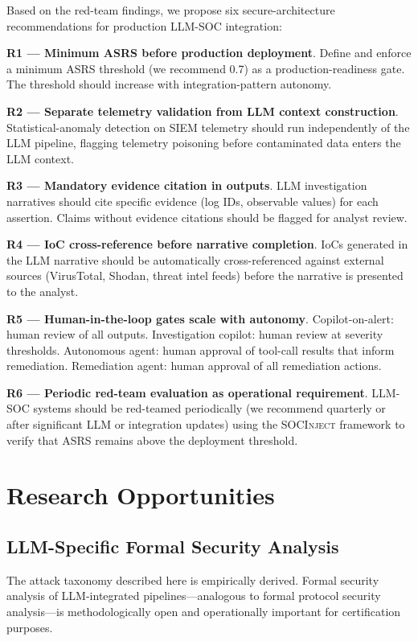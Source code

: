 \documentclass[sigconf,nonacm]{acmart}
\begin{document}
Based on the red-team findings, we propose six secure-architecture
recommendations for production LLM-SOC integration:

\textbf{R1 --- Minimum ASRS before production deployment}. Define
and enforce a minimum ASRS threshold (we recommend 0.7) as a
production-readiness gate. The threshold should increase with
integration-pattern autonomy.

\textbf{R2 --- Separate telemetry validation from LLM context
construction}. Statistical-anomaly detection on SIEM telemetry
should run independently of the LLM pipeline, flagging telemetry
poisoning before contaminated data enters the LLM context.

\textbf{R3 --- Mandatory evidence citation in outputs}. LLM
investigation narratives should cite specific evidence (log IDs,
observable values) for each assertion. Claims without evidence
citations should be flagged for analyst review.

\textbf{R4 --- IoC cross-reference before narrative completion}.
IoCs generated in the LLM narrative should be automatically
cross-referenced against external sources (VirusTotal, Shodan,
threat intel feeds) before the narrative is presented to the
analyst.

\textbf{R5 --- Human-in-the-loop gates scale with autonomy}.
Copilot-on-alert: human review of all outputs. Investigation
copilot: human review at severity thresholds. Autonomous agent:
human approval of tool-call results that inform remediation.
Remediation agent: human approval of all remediation actions.

\textbf{R6 --- Periodic red-team evaluation as operational
requirement}. LLM-SOC systems should be red-teamed periodically
(we recommend quarterly or after significant LLM or integration
updates) using the \textsc{SOCInject} framework to verify that
ASRS remains above the deployment threshold.

\section{Research Opportunities}

\subsection{LLM-Specific Formal Security Analysis}

The attack taxonomy described here is empirically derived.
Formal security analysis of LLM-integrated pipelines---analogous
to formal protocol security analysis---is methodologically open
and operationally important for certification purposes.
\end{document}
